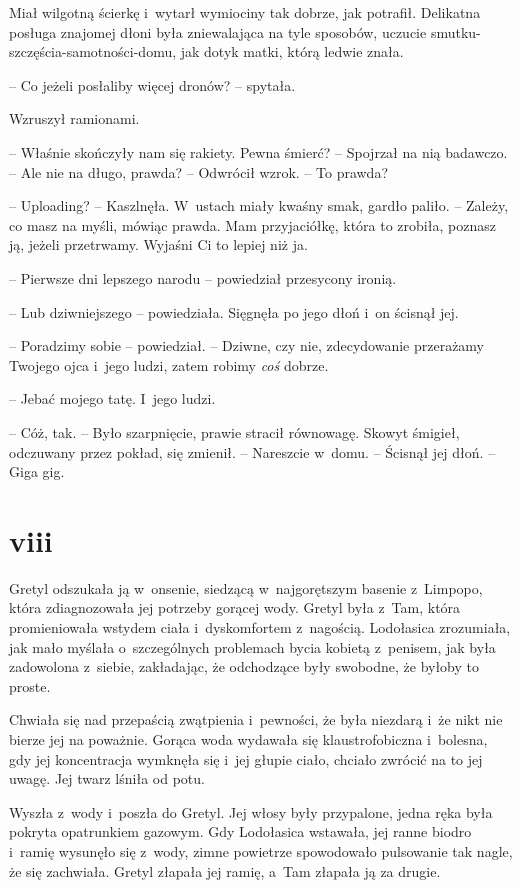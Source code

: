 \documentclass[oneside,polish,11pt,sfheadings]{mwbk}
\begin{document}
Miał wilgotną ścierkę i~wytarł wymiociny tak dobrze, jak potrafił.
Delikatna posługa znajomej dłoni była zniewalająca na tyle sposobów,
uczucie smutku-szczęścia-samotności-domu, jak dotyk matki, którą ledwie
znała. 

-- Co jeżeli posłaliby więcej dronów? -- spytała.

Wzruszył ramionami. 

-- Właśnie skończyły nam się rakiety. Pewna śmierć? -- Spojrzał na nią badawczo. -- Ale nie na długo, prawda? -- Odwrócił wzrok. -- To prawda?

-- Uploading? -- Kaszlnęła. W~ustach miały kwaśny smak, gardło paliło. -- Zależy, co masz na myśli, mówiąc prawda. Mam przyjaciółkę, która to
zrobiła, poznasz ją, jeżeli przetrwamy. Wyjaśni Ci to lepiej niż ja.

-- Pierwsze dni lepszego narodu -- powiedział przesycony ironią.

-- Lub dziwniejszego -- powiedziała. Sięgnęła po jego dłoń i~on ścisnął
jej.

-- Poradzimy sobie -- powiedział. -- Dziwne, czy nie, zdecydowanie
przerażamy Twojego ojca i~jego ludzi, zatem robimy \textit{coś} dobrze.

-- Jebać mojego tatę. I~jego ludzi.

-- Cóż, tak. -- Było szarpnięcie, prawie stracił równowagę. Skowyt
śmigieł, odczuwany przez pokład, się zmienił. -- Nareszcie w~domu. -- Ścisnął jej dłoń. -- Giga gig.

\chapter*{viii}

Gretyl odszukała ją w~onsenie, siedzącą w~najgorętszym basenie z~Limpopo, która zdiagnozowała jej potrzeby gorącej wody. Gretyl była z~Tam, która promieniowała wstydem ciała i~dyskomfortem z~nagością.
Lodołasica zrozumiała, jak mało myślała o~szczególnych problemach bycia
kobietą z~penisem, jak była zadowolona z~siebie, zakładając, że
odchodzące były swobodne, że byłoby to proste.

Chwiała się nad przepaścią zwątpienia i~pewności, że była niezdarą i~że
nikt nie bierze jej na poważnie. Gorąca woda wydawała się
klaustrofobiczna i~bolesna, gdy jej koncentracja wymknęła się i~jej
głupie ciało, chciało zwrócić na to jej uwagę. Jej twarz lśniła od potu.

Wyszła z~wody i~poszła do Gretyl. Jej włosy były przypalone, jedna ręka
była pokryta opatrunkiem gazowym. Gdy Lodołasica wstawała, jej ranne
biodro i~ramię wysunęło się z~wody, zimne powietrze spowodowało
pulsowanie tak nagle, że się zachwiała. Gretyl złapała jej ramię, a~Tam
złapała ją za drugie.
\end{document}
